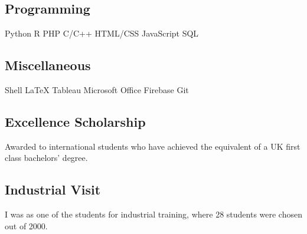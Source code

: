 \documentclass[a4paper]{themagicaltemplate}
\begin{document}
\begin{minipage}[t]{0.33\textwidth}

\subsection{Programming}
Python \textbullet{}   R \textbullet{} PHP \textbullet{} C/C++ \textbullet{} HTML/CSS  \textbullet{}
JavaScript \textbullet{} SQL 
\sectionsep
\subsection{Miscellaneous}
Shell \textbullet{} \LaTeX \textbullet{} Tableau \textbullet{} Microsoft Office \textbullet{} Firebase \textbullet{} Git
\sectionsep


\subsection{Excellence Scholarship}
\vspace{\topsep} %
Awarded to international students who have achieved the equivalent of a UK first class bachelors' degree.
\sectionsep

\subsection{Industrial Visit}
\vspace{\topsep} %
I was as one of the students for industrial training, where 28 students were chosen out of 2000.
\sectionsep

\end{minipage} 
\hfill
\end{document}
